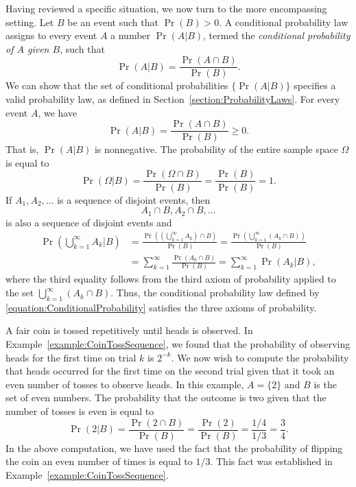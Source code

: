 Having reviewed a specific situation, we now turn to the more encompassing setting.
Let $B$ be an event such that $\Pr (B) > 0$.
A conditional probability law assigns to every event $A$ a number $\Pr (A|B)$, termed the \emph{conditional probability of $A$ given $B$}, such that 
\begin{equation} \label{equation:ConditionalProbability}
\Pr (A | B) = \frac{\Pr (A \cap B)}{\Pr (B)}.
\end{equation}
We can show that the set of conditional probabilities $\{ \Pr (A | B) \}$ specifies a valid probability law, as defined in Section~\ref{section:ProbabilityLaws}.
For every event $A$, we have
\begin{equation*}
\Pr (A|B) = \frac{\Pr (A \cap B)}{\Pr (B)} \geq 0.
\end{equation*}
That is, $\Pr (A|B)$ is nonnegative.
The probability of the entire sample space $\Omega$ is equal to
\begin{equation*}
\Pr (\Omega | B) = \frac{\Pr (\Omega \cap B)}{\Pr (B)}
= \frac{\Pr (B)}{\Pr (B)} = 1 .
\end{equation*}
If $A_1, A_2, \ldots$ is a sequence of disjoint events, then
\begin{equation*}
A_1 \cap B, A_2 \cap B, \ldots
\end{equation*}
is also a sequence of disjoint events and
\begin{equation*}
\begin{split}
\Pr \left( \bigcup_{k=1}^{\infty} A_k \Big| B \right)
&= \frac{\Pr \left( \left( \bigcup_{k=1}^{\infty} A_k \right) \cap B \right)}{\Pr (B)}
= \frac{\Pr \left( \bigcup_{k=1}^{\infty} (A_k \cap B ) \right)}{\Pr (B)} \\
&= \sum_{k = 1}^{\infty} \frac{ \Pr (A_k \cap B ) }{\Pr (B)}
= \sum_{k = 1}^{\infty} \Pr (A_k | B) ,
\end{split}
\end{equation*}
where the third equality follows from the third axiom of probability applied to the set $\bigcup_{k=1}^{\infty} (A_k \cap B )$.
Thus, the conditional probability law defined by \eqref{equation:ConditionalProbability} satisfies the three axioms of probability.

\begin{example}
A fair coin is tossed repetitively until heads is observed.
In Example~\ref{example:CoinTossSequence}, we found that the probability of observing heads for the first time on trial $k$ is $2^{-k}$.
We now wish to compute the probability that heads occurred for the first time on the second trial given that it took an even number of tosses to observe heads.
In this example, $A = \{ 2 \}$ and $B$ is the set of even numbers.
The probability that the outcome is two given that the number of tosses is even is equal to
\begin{equation*}
\Pr ( 2 | B )
= \frac{\Pr ( 2 \cap B )}{\Pr (B)}
= \frac{\Pr (2)}{\Pr (B)}
= \frac{1/4}{1/3}
= \frac{3}{4} .
\end{equation*}
In the above computation, we have used the fact that the probability of flipping the coin an even number of times is equal to $1/3$.
This fact was established in Example~\ref{example:CoinTossSequence}.
\end{example}

